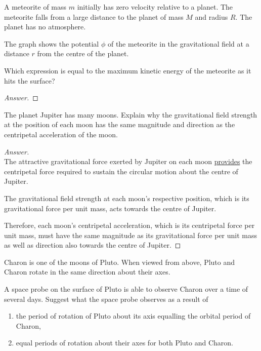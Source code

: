 \begin{prbm}[2015 P1 Q12]
A meteorite of mass $m$ initially has zero velocity relative to a planet. The meteorite falls from a large distance to the planet of mass $M$ and radius $R$. The planet has no atmosphere.

The graph shows the potential $\phi$ of the meteorite in the gravitational field at a distance $r$ from the centre of the planet.

Which expression is equal to the maximum kinetic energy of the meteorite as it hits the surface?
\end{prbm}

\begin{proof}[Answer]

\end{proof}

\begin{prbm}[2018 P1 Q11]

\end{prbm}

\begin{prbm}[2015 P2 Q4]
The planet Jupiter has many moons. Explain why the gravitational field strength at the position of each moon has the same magnitude and direction as the centripetal acceleration of the moon.
\end{prbm}

\begin{proof}[Answer] \ {\\}
The attractive gravitational force exerted by Jupiter on each moon \underline{provides} the centripetal force required to sustain the circular motion about the centre of Jupiter.

The gravitational field strength at each moon's respective position, which is its gravitational force per unit mass, acts towards the centre of Jupiter.

Therefore, each moon's centripetal acceleration, which is its centripetal force per unit mass, must have the same magnitude as its gravitational force per unit mass as well as direction also towards the centre of Jupiter.
\end{proof}

\begin{prbm}[2017 P2 Q2]
Charon is one of the moons of Pluto. When viewed from above, Pluto and Charon rotate in the same direction about their axes.

A space probe on the surface of Pluto is able to observe Charon over a time of several days. Suggest what the space probe observes as a result of
\begin{enumerate}[label=(\roman*)]
\item the period of rotation of Pluto about its axis equalling the orbital period of Charon,
\item equal periods of rotation about their axes for both Pluto and Charon.
\end{enumerate}
\end{prbm}

